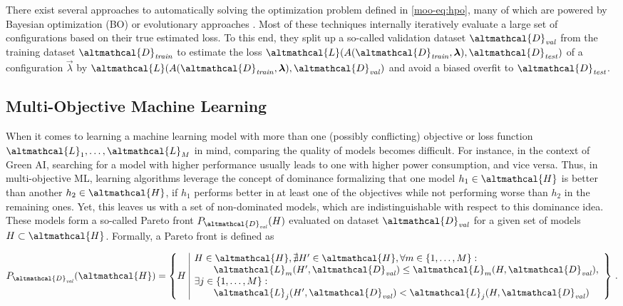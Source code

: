 There exist several approaches to automatically solving the optimization problem defined in \eqref{moo-eq:hpo}, many of which are powered by Bayesian optimization (BO) \cite{frazier-arxiv18a} or evolutionary approaches \cite{bischl-dmkd23a}. 
Most of these techniques internally iteratively evaluate a large set of configurations based on their true estimated loss. 
To this end, they split up a so-called validation dataset $\altmathcal{D}_\mathit{val}$ from the training dataset $\altmathcal{D}_\mathit{train}$ to estimate the loss $\altmathcal{L}(A(\altmathcal{D}_{\mathit{train}}, \vec{\lambda}), \altmathcal{D}_\mathit{test})$ of a configuration $\vec{\lambda}$ by $\altmathcal{L}(A(\altmathcal{D}_{\mathit{train}}, \vec{\lambda}), \altmathcal{D}_\mathit{val})$ and avoid a biased overfit to $\altmathcal{D}_\mathit{test}$.

\subsection{Multi-Objective Machine Learning}
\label{moo-ssec:moo}

When it comes to learning a machine learning model with more than one (possibly conflicting) objective or loss function $\altmathcal{L}_1, \dots, \altmathcal{L}_M$ in mind, comparing the quality of models becomes difficult. For instance, in the context of Green AI, searching for a model with higher performance usually leads to one with higher power consumption, and vice versa. Thus, in multi-objective ML, learning algorithms leverage the concept of dominance formalizing that one model $h_1 \in \altmathcal{H}$ is better than another $h_2 \in \altmathcal{H}$, if $h_1$ performs better in at least one of the objectives while not performing worse than $h_2$ in the remaining ones. Yet, this leaves us with a set of non-dominated models, which are indistinguishable with respect to this dominance idea. These models form a so-called Pareto front $P_{\altmathcal{D}_{\mathit{val}}}(H)$ evaluated on dataset $\altmathcal{D}_{\mathit{val}}$ for a given set of models $H \subset \altmathcal{H}$. Formally, a Pareto front is defined as

\begin{equation}
    \label{moo-eq:pareto_def}
        P_{\altmathcal{D}_{\mathit{val}}}(\altmathcal{H}) = \left\{ H \,\, \begin{array}{|l}
        H \in \altmathcal{H}, \nexists H' \in \altmathcal{H},
        \forall m \in \{1, \dots, M\} : \\
        \quad\quad\altmathcal{L}_m(H',\altmathcal{D}_{\mathit{val}}) \leq \altmathcal{L}_m(H,\altmathcal{D}_{\mathit{val}}), \\
        \exists j \in \{1, \dots, M\} : \\
        \quad\quad\altmathcal{L}_j(H',\altmathcal{D}_{\mathit{val}}) < \altmathcal{L}_j(H, \altmathcal{D}_{\mathit{val}})
        \end{array}\right\} \, .
    \end{equation}

